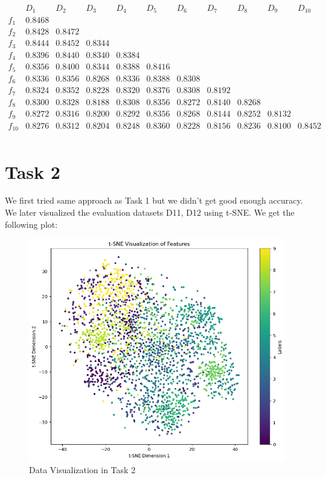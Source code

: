 \documentclass{article} %
\begin{document}
\[
\begin{array}{c|cccccccccc}
 & D_1 & D_2 & D_3 & D_4 & D_5 & D_6 & D_7 & D_8 & D_9 & D_{10} \\
\hline
f_1  & 0.8468 &       &       &       &       &       &       &       &       &       \\
f_2  & 0.8428 & 0.8472 &       &       &       &       &       &       &       &       \\
f_3  & 0.8444 & 0.8452 & 0.8344 &       &       &       &       &       &       &       \\
f_4  & 0.8396 & 0.8440 & 0.8340 & 0.8384 &       &       &       &       &       &       \\
f_5  & 0.8356 & 0.8400 & 0.8344 & 0.8388 & 0.8416 &       &       &       &       &       \\
f_6  & 0.8336 & 0.8356 & 0.8268 & 0.8336 & 0.8388 & 0.8308 &       &       &       &       \\
f_7  & 0.8324 & 0.8352 & 0.8228 & 0.8320 & 0.8376 & 0.8308 & 0.8192 &       &       &       \\
f_8  & 0.8300 & 0.8328 & 0.8188 & 0.8308 & 0.8356 & 0.8272 & 0.8140 & 0.8268 &       &       \\
f_9  & 0.8272 & 0.8316 & 0.8200 & 0.8292 & 0.8356 & 0.8268 & 0.8144 & 0.8252 & 0.8132 &       \\
f_{10} & 0.8276 & 0.8312 & 0.8204 & 0.8248 & 0.8360 & 0.8228 & 0.8156 & 0.8236 & 0.8100 & 0.8452 \\
\end{array}
\]

\section{Task 2}
We first tried same approach as Task 1 but we didn't get good enough accuracy. We later visualized the evaluation datasets D11, D12 using t-SNE. We get the following plot:

\begin{figure}[!h]
    \centering
    \includegraphics[width=0.7\linewidth]{mini-project-2/Plots/task2-tSNE.png}
    \caption{Data Visualization in Task 2}
    \label{fig:enter-label}
\end{figure}
\end{document}
